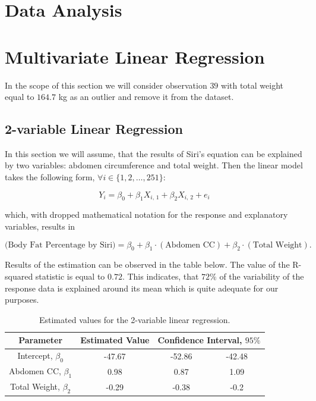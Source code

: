 \documentclass[11pt,american,american]{article}
\begin{document}
\newpage


\section{Data Analysis}\label{sec:analysis}


\newpage{}


\section{Multivariate Linear Regression}\label{sec:regression}

In the scope of this section we will consider observation $39$ with total weight equal to $164.7$ kg as an outlier and remove it from the dataset.

\subsection{2-variable Linear Regression}

In this section we will assume, that the results of Siri's equation can be explained by two variables: abdomen circumference and total weight. Then the linear model takes the following form, $\forall i \in \{1,2, \dots, 251\}$:

\begin{equation}
		Y_{i} = \beta_{0} + \beta_{1} X_{i,\,1} + \beta_{2} X_{i,\,2} + e_{i}
\end{equation}

\medskip
\noindent
which, with dropped mathematical notation for the response and explanatory variables, results in

\begin{equation*}
	\text{(Body Fat Percentage by Siri)} = \beta_{0} + \beta_{1} \cdot (\text{Abdomen CC}) + \beta_{2} \cdot (\text{Total Weight}).
\end{equation*}

\medskip

Results of the estimation can be observed in the table below. The value of the R-squared statistic is equal to $0.72$. This indicates, that $72\%$ of the variability of the response data is explained around its mean which is quite adequate for our purposes. 

\begin{table}[H]
	\centering
	\begin{tabular}{|c||c||c|c|}
		\hline 
		Parameter &  Estimated Value & \multicolumn{2}{c|}{Confidence Interval, $95\%$}  \\ 
		\hline \hline 
		Intercept, $\beta_{0}$ & -47.67 & -52.86 &  -42.48 \\ 
		\hline 
		Abdomen CC, $\beta_{1}$ & 0.98 & 0.87 &  1.09 \\ 
		\hline 
		Total Weight, $\beta_{2}$ & -0.29 & -0.38 & -0.2 \\ 
		\hline 
	\end{tabular} 
\caption{Estimated values for the 2-variable linear regression.}
\end{table}
\end{document}

